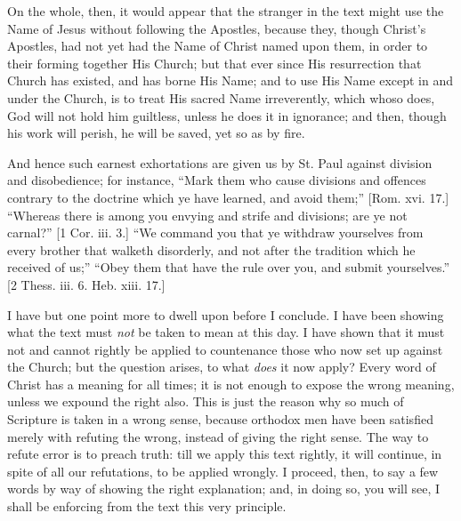 On the whole, then, it would appear that the stranger in the text
might use the Name of Jesus without following the Apostles, because
they, though Christ's Apostles, had not yet had the Name of Christ
named upon them, in order to their forming together His Church; but
that ever since His resurrection that Church has existed, and has
borne His Name; and to use His Name except in and under the Church, is
to treat His sacred Name irreverently, which whoso does, God will not
hold him guiltless, unless he does it in ignorance; and then, though
his work will perish, he will be saved, yet so as by fire.

And hence such earnest exhortations are given us by St. Paul
against division and disobedience; for instance, ``Mark them who
cause divisions and offences contrary to the doctrine which ye have
learned, and avoid them;'' [Rom. xvi. 17.] ``Whereas there is
among you envying and strife and divisions; are ye not carnal?''
[1 Cor. iii. 3.] ``We command you that ye withdraw yourselves from
every brother that walketh disorderly, and not after the tradition
which he received of us;'' ``Obey them that have the rule over
you, and submit yourselves.'' [2 Thess. iii. 6. Heb. xiii. 17.]

I have but one point more to dwell upon before I conclude. I have
been showing what the text must \emph{not} be taken to mean at this
day. I have shown that it must not and cannot rightly be applied to
countenance those who now set up against the Church; but the question
arises, to what \emph{does} it now apply? Every word of Christ has a
meaning for all times; it is not enough to expose the wrong meaning,
unless we expound the right also. This is just the reason why so much
of Scripture is taken in a wrong sense, because orthodox men have been
satisfied merely with refuting the wrong, instead of giving the right
sense. The way to refute error is to preach truth: till we apply this
text rightly, it will continue, in spite of all our refutations, to be
applied wrongly. I proceed, then, to say a few words by way of showing
the right explanation; and, in doing so, you will see, I shall be
enforcing from the text this very principle.

